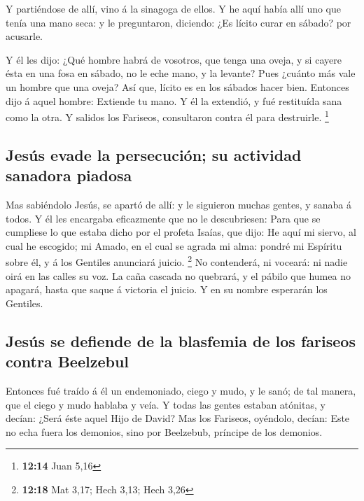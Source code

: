  Y partiéndose de allí, vino á la sinagoga de ellos.
 Y he aquí había allí uno que tenía una mano seca: y le
preguntaron, diciendo: ¿Es lícito curar en sábado? por acusarle.

 Y él les dijo: ¿Qué hombre habrá de vosotros, que tenga
una oveja, y si cayere ésta en una fosa en sábado, no le eche mano, y la
levante?  Pues ¿cuánto más vale un hombre que una oveja?
Así que, lícito es en los sábados hacer bien.  Entonces
dijo á aquel hombre: Extiende tu mano. Y él la extendió, y fué
restituída sana como la otra.  Y salidos los Fariseos,
consultaron contra él para destruirle. \footnote{\textbf{12:14} Juan
  5,16}

\hypertarget{jesuxfas-evade-la-persecuciuxf3n-su-actividad-sanadora-piadosa}{%
\subsection{Jesús evade la persecución; su actividad sanadora
piadosa}\label{jesuxfas-evade-la-persecuciuxf3n-su-actividad-sanadora-piadosa}}

 Mas sabiéndolo Jesús, se apartó de allí: y le siguieron
muchas gentes, y sanaba á todos.  Y él les encargaba
eficazmente que no le descubriesen:  Para que se cumpliese
lo que estaba dicho por el profeta Isaías, que dijo:  He
aquí mi siervo, al cual he escogido; mi Amado, en el cual se agrada mi
alma: pondré mi Espíritu sobre él, y á los Gentiles anunciará juicio.
\footnote{\textbf{12:18} Mat 3,17; Hech 3,13; Hech 3,26} 
No contenderá, ni voceará: ni nadie oirá en las calles su voz.
 La caña cascada no quebrará, y el pábilo que humea no
apagará, hasta que saque á victoria el juicio.  Y en su
nombre esperarán los Gentiles.

\hypertarget{jesuxfas-se-defiende-de-la-blasfemia-de-los-fariseos-contra-beelzebul}{%
\subsection{Jesús se defiende de la blasfemia de los fariseos contra
Beelzebul}\label{jesuxfas-se-defiende-de-la-blasfemia-de-los-fariseos-contra-beelzebul}}

 Entonces fué traído á él un endemoniado, ciego y mudo, y
le sanó; de tal manera, que el ciego y mudo hablaba y veía.
 Y todas las gentes estaban atónitas, y decían: ¿Será éste
aquel Hijo de David?  Mas los Fariseos, oyéndolo, decían:
Este no echa fuera los demonios, sino por Beelzebub, príncipe de los
demonios.

